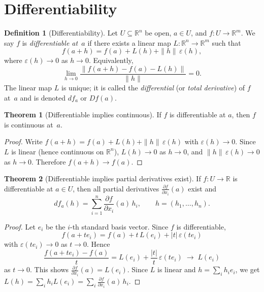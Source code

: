 \documentclass[12pt,a4paper]{book}
\theoremstyle{definition}
\newtheorem{definition}{Definition}[chapter]
\newtheorem{theorem}{Theorem}[chapter]
\begin{document}
\section{Differentiability}
\label{sec:differentiability}

\begin{tcolorbox}[
  colback=yellow!5!white,
  colframe=orange!70!black,
  fonttitle=\bfseries,
  title={Key Definition: Differentiability},
  breakable
]
\begin{definition}[Differentiability]\label{def:differentiable}
Let $U\subseteq\mathbb{R}^n$ be open, $a\in U$, and
$f\colon U\to\mathbb{R}^m$.  We say $f$ is \emph{differentiable at~$a$}
if there exists a linear map $L\colon\mathbb{R}^n\to\mathbb{R}^m$ such that
\[
  f(a+h) = f(a) + L(h) + \|h\|\,\varepsilon(h),
\]
where $\varepsilon(h)\to 0$ as $h\to 0$.  Equivalently,
\[
  \lim_{h\to 0}\frac{\|f(a+h)-f(a)-L(h)\|}{\|h\|}=0.
\]
The linear map $L$ is unique; it is called the \emph{differential} (or
\emph{total derivative}) of $f$ at~$a$ and is denoted $df_a$ or $Df(a)$.
\end{definition}
\end{tcolorbox}

\begin{theorem}[Differentiable implies continuous]
\label{thm:diff-implies-cont}
If $f$ is differentiable at $a$, then $f$ is continuous at~$a$.
\end{theorem}

\begin{proof}
Write $f(a+h)=f(a)+L(h)+\|h\|\,\varepsilon(h)$ with $\varepsilon(h)\to 0$.
Since $L$ is linear (hence continuous on $\mathbb{R}^n$), $L(h)\to 0$ as
$h\to 0$, and $\|h\|\,\varepsilon(h)\to 0$ as $h\to 0$.  Therefore
$f(a+h)\to f(a)$.
\end{proof}

\begin{theorem}[Differentiable implies partial derivatives exist]
\label{thm:diff-implies-partials}
If $f\colon U\to\mathbb{R}$ is differentiable at $a\in U$, then all partial
derivatives $\frac{\partial f}{\partial x_i}(a)$ exist and
\[
  df_a(h) = \sum_{i=1}^{n}\frac{\partial f}{\partial x_i}(a)\,h_i,
  \qquad h=(h_1,\dots,h_n).
\]
\end{theorem}

\begin{proof}
Let $e_i$ be the $i$-th standard basis vector.  Since $f$ is differentiable,
\[
  f(a+te_i)=f(a)+t\,L(e_i)+|t|\,\varepsilon(te_i)
\]
with $\varepsilon(te_i)\to 0$ as $t\to 0$.  Hence
\[
  \frac{f(a+te_i)-f(a)}{t}=L(e_i)+\frac{|t|}{t}\,\varepsilon(te_i)
  \;\longrightarrow\; L(e_i)
\]
as $t\to 0$.  This shows $\frac{\partial f}{\partial x_i}(a)=L(e_i)$.
Since $L$ is linear and $h=\sum_i h_i e_i$, we get
$L(h)=\sum_i h_i L(e_i)=\sum_i \frac{\partial f}{\partial x_i}(a)\,h_i$.
\end{proof}
\end{document}
